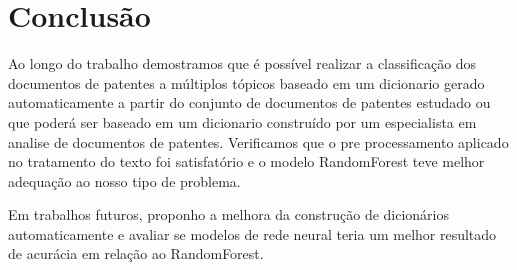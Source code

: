 \chapter{Conclusão}

Ao longo do trabalho demostramos que é possível realizar a classificação dos documentos de patentes a múltiplos tópicos baseado em um dicionario gerado automaticamente a partir do conjunto de documentos de patentes estudado ou que poderá ser baseado em um dicionario construído por um especialista em analise de documentos de patentes. Verificamos que o pre processamento aplicado no tratamento do texto foi satisfatório e o modelo RandomForest teve melhor adequação ao nosso tipo de problema.

Em trabalhos futuros, proponho a melhora da construção de dicionários automaticamente e avaliar se modelos de rede neural teria um melhor resultado de acurácia em relação ao RandomForest.

